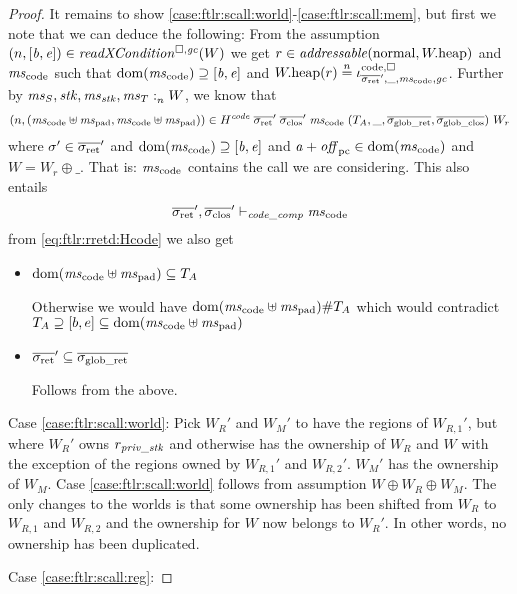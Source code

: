 \begin{proof}
  It remains to show \ref{case:ftlr:scall:world}-\ref{case:ftlr:scall:mem}, but first we note that we can deduce the following: From the assumption $\npair{[\baddr,\eaddr]} \in \xReadCond{W}$ we get $r \in \addressable{\normal, \pwheap}$ and $\mscode$ such that $\dom(\mscode) \supseteq [\baddr,\eaddr]$ and $\pwheap(r) \nequal \codereg{\sigrets',\_,\mscode,\gc}$.
  Further by $\mathit{ms}_S,\mathit{stk},\mathit{ms}_{\mathit{stk}},\mathit{ms}_T :_{n}^{}W$, we know that
  \begin{equation}
    \npair{(\mscode\uplus\mspad,\mscode\uplus\mspad)} \in H^{\var{code}} \; \sigrets' \; \sigcloss' \; \mscode \; (\ta,\_,\gsigrets,\gsigcloss)~ W_r\label{eq:ftlr:rretd:Hcode}
  \end{equation}
  where $\sigma' \in \sigrets'$ and $\dom(\mscode) \supseteq [\baddr,\eaddr]$ and $\aaddr + \offpc \in \dom(\mscode)$ and $W = W_r \oplus \_$.
  That is: $\mscode$ contains the call we are considering.
  This also entails
  \begin{equation}
    \label{eq:ftlr:code-comp-jud}
    \sigrets',\sigcloss' \vdash_\var{code\_comp} \mscode
  \end{equation}
  from \ref{eq:ftlr:rretd:Hcode} we also get
\begin{itemize}
\item $\dom(\mscode\uplus\mspad) \subseteq \ta$

  Otherwise we would have $\dom(\mscode\uplus\mspad) \# \ta$ which would contradict $\ta\supseteq [b,e] \subseteq\dom(\mscode\uplus\mspad)$

\item $\sigrets' \subseteq \gsigrets$

  Follows from the above.
\end{itemize}


  Case \ref{case:ftlr:scall:world}: Pick $W_R'$ and $W_M'$ to have the regions of $W_{R,1}'$, but where $W_R'$ owns $r_{\mathit{priv\_stk}}$ and otherwise has the ownership of $W_R$ and $W$ with the exception of the regions owned by $W_{R,1}'$ and $W_{R,2}'$.
  $W_M'$ has the ownership of $W_M$.
  Case \ref{case:ftlr:scall:world} follows from assumption $W \oplus W_R \oplus W_M$.
  The only changes to the worlds is that some ownership has been shifted from $W_R$ to $W_{R,1}$ and $W_{R,2}$ and the ownership for $W$ now belongs to $W_R'$.
  In other words, no ownership has been duplicated.

  Case \ref{case:ftlr:scall:reg}:


\end{proof}
